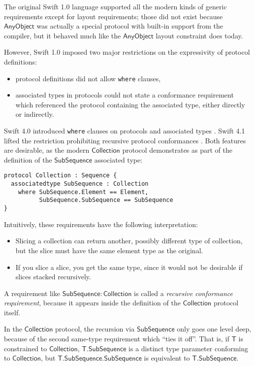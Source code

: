 \documentclass[headsepline,bibliography=totoc]{scrreport}
\newcommand{\namesym}[1]{\mathsf{#1}}
\newcommand{\genericparam}[1]{\bm{\mathsf{#1}}}
\newcommand{\proto}[1]{\bm{\mathsf{#1}}}
\theoremstyle{definition}
\theoremstyle{definition}
\theoremstyle{definition}
\begin{document}
The original Swift 1.0 language supported all the modern kinds of generic requirements except for layout requirements; those did not exist because $\proto{AnyObject}$ was actually a special protocol with built-in support from the compiler, but it behaved much like the $\proto{AnyObject}$ layout constraint does today.

However,  Swift 1.0 imposed two major restrictions on the expressivity of protocol definitions:
\begin{itemize}
\item protocol definitions did not allow \texttt{where} clauses,
\item associated types in protocols could not state a conformance requirement which referenced the protocol containing the associated type, either directly or indirectly.
\end{itemize}
Swift 4.0 introduced \texttt{where} clauses on protocols and associated types \cite{se0142}. Swift 4.1 lifted the restriction prohibiting recursive protocol conformances \cite{se0157}. Both features are desirable, as the modern $\proto{Collection}$ protocol demonstrates as part of the definition of the $\namesym{SubSequence}$ associated type:
\begin{Verbatim}
protocol Collection : Sequence {
  associatedtype SubSequence : Collection
    where SubSequence.Element == Element,
          SubSequence.SubSequence == SubSequence
}
\end{Verbatim}
Intuitively, these requirements have the following interpretation:
\begin{itemize}
\item Slicing a collection can return another, possibly different type of collection, but the slice must have the same element type as the original.
\item If you slice a slice, you get the same type, since it would not be desirable if slices stacked recursively.
\end{itemize}

A requirement like $\namesym{SubSequence}\colon\proto{Collection}$ is called a  \emph{recursive conformance requirement}, because it appears inside the definition of the $\proto{Collection}$ protocol itself.

In the $\proto{Collection}$ protocol, the recursion via $\namesym{SubSequence}$ only goes one level deep, because of the second same-type requirement which ``ties it off''. That is, if $\genericparam{T}$ is constrained to $\proto{Collection}$, $\genericparam{T}.\namesym{SubSequence}$ is a distinct type parameter conforming to $\proto{Collection}$, but $\genericparam{T}.\namesym{SubSequence}.\namesym{SubSequence}$ is equivalent to $\genericparam{T}.\namesym{SubSequence}$.
\end{document}
